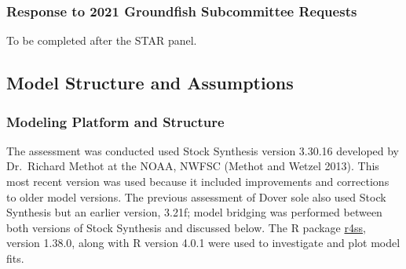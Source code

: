 \documentclass[11pt,
  english,
  a4paper,
]{article}
\begin{document}
\leavevmode\tagmcend\tagstructend\par


\hypertarget{response-to-2021-groundfish-subcommittee-requests}{%
\subsubsection{Response to 2021 Groundfish Subcommittee Requests}\label{response-to-2021-groundfish-subcommittee-requests}}

\leavevmode\tagmcend\tagstructend


To be completed after the STAR panel.

\leavevmode\tagmcend\tagstructend\par


\hypertarget{model-structure-and-assumptions}{%
\subsection{Model Structure and Assumptions}\label{model-structure-and-assumptions}}

\leavevmode\tagmcend\tagstructend


\hypertarget{modeling-platform-and-structure}{%
\subsubsection{Modeling Platform and Structure}\label{modeling-platform-and-structure}}

\leavevmode\tagmcend\tagstructend


The assessment was conducted used Stock Synthesis version 3.30.16 developed by Dr.~Richard Methot at the NOAA, NWFSC {(Methot and Wetzel 2013)\leavevmode\tagmcend\tagstructend}. This most recent version was used because it included improvements and corrections to older model versions. The previous assessment of Dover sole also used Stock Synthesis but an earlier version, 3.21f; model bridging was performed between both versions of Stock Synthesis and discussed below. The R package {\href{https://github.com/r4ss/r4ss}{r4ss}\leavevmode\tagmcend\tagstructend}, version 1.38.0, along with R version 4.0.1 were used to investigate and plot model fits.
\end{document}
